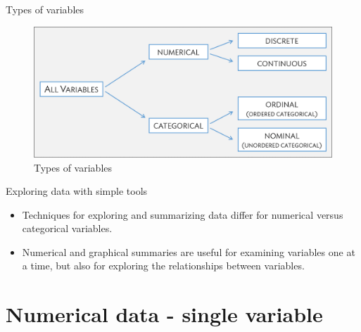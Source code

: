 \documentclass[10pt,handout]{beamer}\usepackage[]{graphicx}\usepackage[]{color}
\begin{document}
\begin{frame}{Types of variables}
	\protect\hypertarget{types-of-variables-1}{}
	
	\begin{figure}
		\centering
		\includegraphics[scale=0.5]{figures/variableTypes.png}
		\caption{Types of variables}
	\end{figure}
	
\end{frame}



\begin{frame}{Exploring data with simple tools}
	\protect\hypertarget{exploring-data-with-simple-tools}{}
	
	\begin{itemize}
		\item Techniques for exploring and summarizing data differ for numerical
	versus categorical variables.
	
	\item Numerical and graphical summaries are useful for examining variables one
	at a time, but also for exploring the relationships between variables.
	\end{itemize}
	
\end{frame}


\section{Numerical data - single variable}\label{sec:numerical-data}
\end{document}
